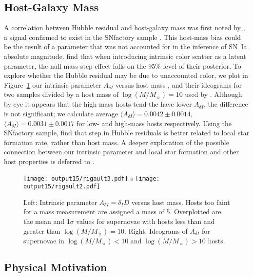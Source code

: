 \documentclass{aastex61}   	%
\begin{document}
\subsection{Host-Galaxy Mass}
A correlation between Hubble residual and host-galaxy mass
was first noted by \citet{2010ApJ...715..743K,2010MNRAS.406..782S}, a signal confirmed to exist in the SNfactory
sample \citep{2013ApJ...770..108C}.
This host-mass bias could be the result of a parameter that was not accounted for in the inference of SN~Ia absolute magnitude.
\citet{2016arXiv160904470M} find that when introducing intrinsic color scatter as a latent parameter, the null mass-step effect falls on the 95\%-level of their posterior.
To explore whether the Hubble residual may be due to unaccounted color,
we plot in Figure~\ref{childress:fig} our intrinsic parameter  $A_{\delta I}$  versus host mass 
\citep{2016rigault}, and their ideograms for two samples divided by a host mass of  $\log{(M/M_\sun)}=10$
used by  \citet{2013ApJ...770..108C}.
Although by eye it appears that the high-mass hosts tend the have lower $A_{\delta I}$, the difference is
not significant; we calculate  average $\langle A_{\delta I} \rangle=   0.0042 \pm    0.0014$,
$\langle A_{\delta I} \rangle=   0.0031 \pm    0.0017 $ for low- and high-mass hosts respectively. 
Using the SNfactory sample,
\citet{2013A&A...560A..66R} find that step in Hubble residuals is better related to local star formation rate, rather than host mass.
A deeper exploration of the possible connection between our intrinsic parameter and local star formation and other host properties is deferred to
\citet{2016rigault}.
\color{black}
\begin{figure}[htbp] %
   \centering
   \texttt{[image: output15/rigault3.pdf]}
s     \texttt{[image: output15/rigault2.pdf]}
      \caption{Left: Intrinsic parameter $A_{\delta I}=\delta_I D$  versus host mass.  Hosts too faint for a mass measurement
      are assigned a mass of 5.  Overplotted are the mean and 1$\sigma$ values for supernovae with hosts
      less than and greater than  $\log{(M/M_\sun)}=10$.
Right: Ideograms of  $A_{\delta I}$ for supernovae in $\log{(M/M_\sun)}<10$ and $\log{(M/M_\sun)}>10$ hosts. 
   \label{childress:fig}}
\end{figure}


\subsection{Physical Motivation}
\end{document}
